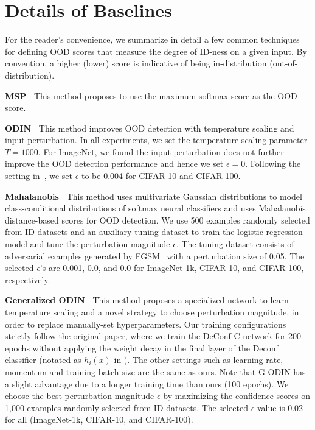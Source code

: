 \documentclass[runningheads]{llncs}
\begin{document}
\section{Details of Baselines}
\label{sec:baseline}

For the reader's convenience, we summarize in detail a few common techniques for defining OOD scores that measure the degree of ID-ness on a given input.
By convention, a higher (lower) score is indicative of being in-distribution (out-of-distribution).

\noindent \textbf{MSP~\cite{Kevin}} This method proposes to use the maximum softmax score as the OOD score.


\noindent \textbf{ODIN~\cite{liang2018enhancing}} This method improves OOD detection with temperature scaling and input perturbation. In all experiments, we set the temperature scaling parameter $T = 1000$. 
For ImageNet, we found the input perturbation does not further improve the OOD detection performance and hence we set $\epsilon=0$. 
Following the setting in~\cite{liang2018enhancing}, we set $\epsilon$ to be 0.004 for CIFAR-10 and CIFAR-100.

\noindent \textbf{Mahalanobis~\cite{lee2018simple}}  This method uses multivariate Gaussian distributions to model class-conditional distributions of softmax neural classifiers and uses Mahalanobis distance-based scores for OOD detection. We use 500 examples randomly selected from ID datasets and an auxiliary tuning dataset to train the logistic regression model and tune the perturbation magnitude $\epsilon$. The tuning dataset consists of adversarial examples generated by FGSM~\cite{goodfellow2014explaining} with a perturbation size of 0.05.\@
The selected $\epsilon$'s are 0.001, 0.0, and 0.0 for ImageNet-1k, CIFAR-10, and CIFAR-100, respectively.

\noindent \textbf{Generalized ODIN~\cite{godin2020CVPR}}  This method proposes a specialized network to learn temperature scaling and a novel strategy to choose perturbation magnitude, in order to replace manually-set hyperparameters. Our training configurations strictly follow the original paper, where we train the DeConf-C network for 200 epochs without applying the weight decay in the final layer of the Deconf classifier (notated as $h_i(x)$ in \cite{godin2020CVPR}). The other settings such as learning rate, momentum and training batch size are the same as ours. Note that  G-ODIN has a slight advantage due to a longer training time than ours (100 epochs). We choose the best perturbation magnitude $\epsilon$ by maximizing the confidence scores on 1,000 examples randomly selected from ID datasets. The selected $\epsilon$ value is 0.02 for all (ImageNet-1k, CIFAR-10, and CIFAR-100).
\end{document}
